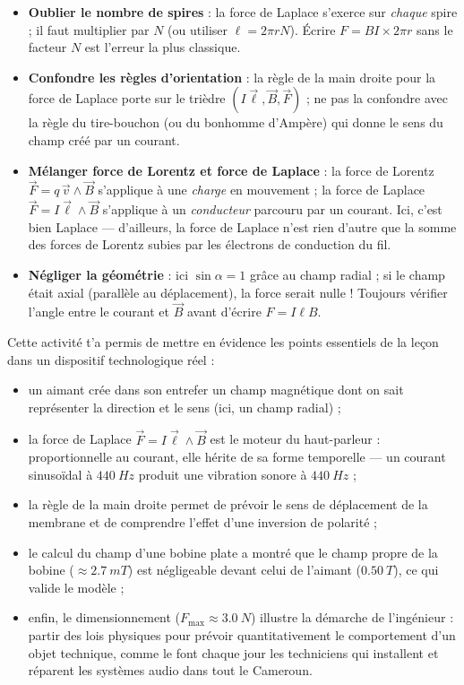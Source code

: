 \documentclass[11pt]{article}
\newcommand{\cle}[1]{{\popxbold\color{popdark}#1}}
\newcounter{popsec}
\newcounter{popsub}
\newcommand{\courssub}[1]{%
  \stepcounter{popsub}%
  \par\vspace{9pt}\noindent{\popxbold\fontsize{11.5}{13}\selectfont\color{popink}{\color{poporange}\thepopsec.\thepopsub}\hspace{6pt}#1}\par\nopagebreak\vspace{4pt}
}
\begin{document}
\begin{attention}
\begin{itemize}
\item \textbf{Oublier le nombre de spires} : la force de Laplace s'exerce sur \emph{chaque} spire ; il faut multiplier par $N$ (ou utiliser $\ell = 2\pi r N$). Écrire $F = B I \times 2\pi r$ sans le facteur $N$ est l'erreur la plus classique.
\item \textbf{Confondre les règles d'orientation} : la règle de la main droite pour la force de Laplace porte sur le trièdre $(I\vec{\ell}, \vec{B}, \vec{F})$ ; ne pas la confondre avec la règle du tire-bouchon (ou du bonhomme d'Ampère) qui donne le sens du champ créé par un courant.
\item \textbf{Mélanger force de Lorentz et force de Laplace} : la force de Lorentz $\vec{F} = q\,\vec{v}\wedge\vec{B}$ s'applique à une \emph{charge} en mouvement ; la force de Laplace $\vec{F} = I\vec{\ell}\wedge\vec{B}$ s'applique à un \emph{conducteur} parcouru par un courant. Ici, c'est bien Laplace — d'ailleurs, la force de Laplace n'est rien d'autre que la somme des forces de Lorentz subies par les électrons de conduction du fil.
\item \textbf{Négliger la géométrie} : ici $\sin\alpha = 1$ grâce au champ radial ; si le champ était axial (parallèle au déplacement), la force serait nulle ! Toujours vérifier l'angle entre le courant et $\vec{B}$ avant d'écrire $F = I\ell B$.
\end{itemize}
\end{attention}

\courssub{Bilan de l'activité}

Cette activité t'a permis de mettre en évidence les points essentiels de la leçon dans un dispositif technologique réel :

\begin{itemize}
\item un \cle{aimant} crée dans son entrefer un champ magnétique dont on sait représenter la direction et le sens (ici, un champ radial) ;
\item la \cle{force de Laplace} $\vec{F} = I\vec{\ell}\wedge\vec{B}$ est le moteur du haut-parleur : proportionnelle au courant, elle hérite de sa forme temporelle — un courant sinusoïdal à $\SI{440}{Hz}$ produit une vibration sonore à $\SI{440}{Hz}$ ;
\item la \cle{règle de la main droite} permet de prévoir le sens de déplacement de la membrane et de comprendre l'effet d'une inversion de polarité ;
\item le calcul du champ d'une \cle{bobine plate} a montré que le champ propre de la bobine ($\approx \SI{2,7}{mT}$) est négligeable devant celui de l'aimant ($\SI{0,50}{T}$), ce qui valide le modèle ;
\item enfin, le dimensionnement ($F_{\max} \approx \SI{3,0}{N}$) illustre la démarche de l'ingénieur : partir des lois physiques pour prévoir quantitativement le comportement d'un objet technique, comme le font chaque jour les techniciens qui installent et réparent les systèmes audio dans tout le Cameroun.
\end{itemize}
\end{document}
